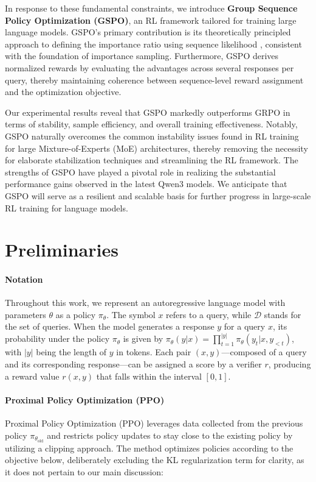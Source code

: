 In response to these fundamental constraints, we introduce \textbf{Group Sequence Policy Optimization (GSPO)}, an RL framework tailored for training large language models. GSPO's primary contribution is its theoretically principled approach to defining the importance ratio using sequence likelihood \citep{click}, consistent with the foundation of importance sampling. Furthermore, GSPO derives normalized rewards by evaluating the advantages across several responses per query, thereby maintaining coherence between sequence-level reward assignment and the optimization objective.

Our experimental results reveal that GSPO markedly outperforms GRPO in terms of stability, sample efficiency, and overall training effectiveness. Notably, GSPO naturally overcomes the common instability issues found in RL training for large Mixture-of-Experts (MoE) architectures, thereby removing the necessity for elaborate stabilization techniques and streamlining the RL framework. The strengths of GSPO have played a pivotal role in realizing the substantial performance gains observed in the latest Qwen3 models. We anticipate that GSPO will serve as a resilient and scalable basis for further progress in large-scale RL training for language models.

\section{Preliminaries}

\paragraph{Notation}
Throughout this work, we represent an autoregressive language model with parameters $\theta$ as a policy $\pi_\theta$. The symbol $x$ refers to a query, while $\mathcal{D}$ stands for the set of queries. When the model generates a response $y$ for a query $x$, its probability under the policy $\pi_\theta$ is given by $\pi_\theta(y | x) = \prod_{t=1}^{|y|} \pi_\theta(y_t | x, y_{<t} )$, with $|y|$ being the length of $y$ in tokens. Each pair $(x, y)$—composed of a query and its corresponding response—can be assigned a score by a verifier $r$, producing a reward value $r(x, y)$ that falls within the interval $[ 0, 1 ]$.

\paragraph{Proximal Policy Optimization (PPO)} Proximal Policy Optimization (PPO) \citep{ppo} leverages data collected from the previous policy $\pi_{\theta_\text{old}}$ and restricts policy updates to stay close to the existing policy by utilizing a clipping approach. The method optimizes policies according to the objective below, deliberately excluding the KL regularization term for clarity, as it does not pertain to our main discussion:

